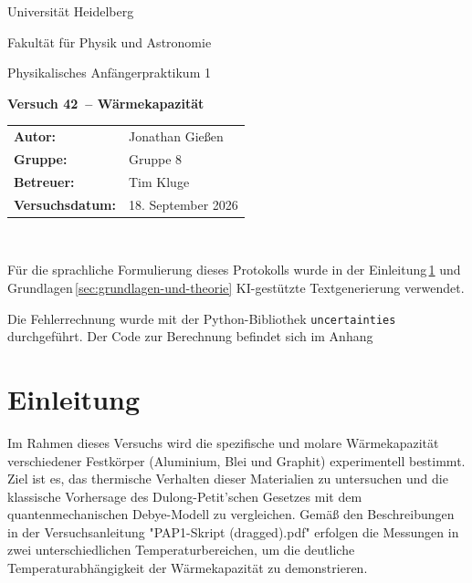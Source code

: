 \documentclass[12pt,a4paper,titlepage]{scrartcl}
\numberwithin{equation}{section}
\numberwithin{table}{section}
\numberwithin{figure}{section}
\newcommand{\versuch}{Versuch 42}
\newcommand{\titel}{Wärmekapazität}
\newcommand{\praktikum}{Physikalisches Anfängerpraktikum 1}
\newcommand{\autor}{Jonathan Gießen}
\newcommand{\gruppe}{Gruppe 8}
\newcommand{\datum}{18. September 2026}
\newcommand{\betreuer}{Tim Kluge}
\begin{document}
\pagestyle{scrheadings}

\begin{titlepage}



    \centering
    \vspace*{4cm}
    {\large Universität Heidelberg\par}
    {\small Fakultät für Physik und Astronomie\par}
    {\Large \praktikum\par}
    \vspace{0.8cm}
    {\LARGE \bfseries \versuch\ -- \titel\par}
    \vspace{1.5cm}

    \begin{tabular}{ll}
        \textbf{Autor:} & \autor\\
        \textbf{Gruppe:} & \gruppe\\
        \textbf{Betreuer:} & \betreuer\\
        \textbf{Versuchsdatum:} & \datum\\
    \end{tabular}

    \vfill
    \hrulefill\
\end{titlepage}

\tableofcontents

\bigskip
\begin{tcolorbox}[colback=gray!5,colframe=gray!60,boxrule=0.8pt,arc=0.01mm,title=KI-Hinweis]
    Für die sprachliche Formulierung dieses Protokolls wurde in der Einleitung\,\ref{sec:Einleitung} und Grundlagen\,\ref{sec:grundlagen-und-theorie} KI-gestützte Textgenerierung verwendet. 
\end{tcolorbox}
\begin{tcolorbox}[colback=gray!5,colframe=gray!60,boxrule=0.8pt,arc=0.01mm,title=Berechnungen der Fehlerformeln]
    Die Fehlerrechnung wurde mit der Python-Bibliothek \texttt{uncertainties} durchgeführt. Der Code zur Berechnung befindet sich im Anhang
\end{tcolorbox}


\clearpage


\section{Einleitung}\label{sec:Einleitung}

Im Rahmen dieses Versuchs wird die spezifische und molare Wärmekapazität verschiedener Festkörper (Aluminium, Blei und Graphit) experimentell bestimmt. Ziel ist es, das thermische Verhalten dieser Materialien zu untersuchen und die klassische Vorhersage des Dulong-Petit'schen Gesetzes mit dem quantenmechanischen Debye-Modell zu vergleichen. Gemäß den Beschreibungen in der Versuchsanleitung "PAP1-Skript (dragged).pdf" erfolgen die Messungen in zwei unterschiedlichen Temperaturbereichen, um die deutliche Temperaturabhängigkeit der Wärmekapazität zu demonstrieren.
\end{document}

